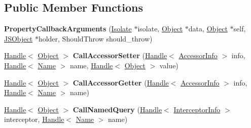 \subsection*{Public Member Functions}
\begin{DoxyCompactItemize}
\item 
\mbox{\label{classv8_1_1internal_1_1PropertyCallbackArguments_ae0b6aec73c155386bae136b14798fc94}} 
{\bfseries Property\+Callback\+Arguments} (\mbox{\hyperlink{classv8_1_1internal_1_1Isolate}{Isolate}} $\ast$isolate, \mbox{\hyperlink{classv8_1_1internal_1_1Object}{Object}} $\ast$data, \mbox{\hyperlink{classv8_1_1internal_1_1Object}{Object}} $\ast$self, \mbox{\hyperlink{classv8_1_1internal_1_1JSObject}{J\+S\+Object}} $\ast$holder, Should\+Throw should\+\_\+throw)
\item 
\mbox{\label{classv8_1_1internal_1_1PropertyCallbackArguments_aca5c484a1cd0fe9e0ce0a1747e56c938}} 
\mbox{\hyperlink{classv8_1_1internal_1_1Handle}{Handle}}$<$ \mbox{\hyperlink{classv8_1_1internal_1_1Object}{Object}} $>$ {\bfseries Call\+Accessor\+Setter} (\mbox{\hyperlink{classv8_1_1internal_1_1Handle}{Handle}}$<$ \mbox{\hyperlink{classv8_1_1internal_1_1AccessorInfo}{Accessor\+Info}} $>$ info, \mbox{\hyperlink{classv8_1_1internal_1_1Handle}{Handle}}$<$ \mbox{\hyperlink{classv8_1_1internal_1_1Name}{Name}} $>$ name, \mbox{\hyperlink{classv8_1_1internal_1_1Handle}{Handle}}$<$ \mbox{\hyperlink{classv8_1_1internal_1_1Object}{Object}} $>$ value)
\item 
\mbox{\label{classv8_1_1internal_1_1PropertyCallbackArguments_a84c282aa4accc8634ad41c55225e8b54}} 
\mbox{\hyperlink{classv8_1_1internal_1_1Handle}{Handle}}$<$ \mbox{\hyperlink{classv8_1_1internal_1_1Object}{Object}} $>$ {\bfseries Call\+Accessor\+Getter} (\mbox{\hyperlink{classv8_1_1internal_1_1Handle}{Handle}}$<$ \mbox{\hyperlink{classv8_1_1internal_1_1AccessorInfo}{Accessor\+Info}} $>$ info, \mbox{\hyperlink{classv8_1_1internal_1_1Handle}{Handle}}$<$ \mbox{\hyperlink{classv8_1_1internal_1_1Name}{Name}} $>$ name)
\item 
\mbox{\label{classv8_1_1internal_1_1PropertyCallbackArguments_af7407b305dd8a6e17d4d9ec9bed4099e}} 
\mbox{\hyperlink{classv8_1_1internal_1_1Handle}{Handle}}$<$ \mbox{\hyperlink{classv8_1_1internal_1_1Object}{Object}} $>$ {\bfseries Call\+Named\+Query} (\mbox{\hyperlink{classv8_1_1internal_1_1Handle}{Handle}}$<$ \mbox{\hyperlink{classv8_1_1internal_1_1InterceptorInfo}{Interceptor\+Info}} $>$ interceptor, \mbox{\hyperlink{classv8_1_1internal_1_1Handle}{Handle}}$<$ \mbox{\hyperlink{classv8_1_1internal_1_1Name}{Name}} $>$ name)

\end{DoxyCompactItemize}
